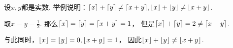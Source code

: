 \begin{example}
设\(x,y\)都是实数.
举例说明：\(\lceil x\rceil + \lceil y\rceil \neq \lceil x+y\rceil,
\lfloor x\rfloor + \lfloor y\rfloor \neq \lfloor x+y\rfloor\).
\begin{solution}
取\(x = y = \frac12\).
那么\(\lceil x\rceil = \lceil y\rceil = \lceil x+y\rceil = 1\)，
但是\(\lceil x\rceil + \lceil y\rceil = 2 \neq \lceil x+y\rceil\).

与此同时，\(\lfloor x\rfloor = \lfloor y\rfloor = 0,
\lfloor x+y\rfloor = 1\)，
因此\(\lfloor x\rfloor + \lfloor y\rfloor \neq \lfloor x+y\rfloor\).
\end{solution}
\end{example}
